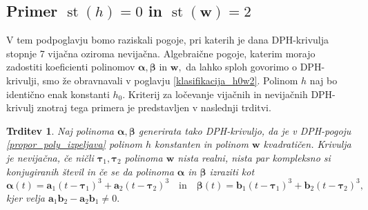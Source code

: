 \documentclass[12pt,a4paper,twoside]{article}
\theoremstyle{definition} %
\theoremstyle{plain} %
\newtheorem{trditev}[definicija]{Trditev}
\theoremstyle{primerstyle}
\numberwithin{equation}{section}  %
\newcommand{\aV}{\mathbf{a}}
\newcommand{\bV}{\mathbf{b}}
\newcommand{\wV}{\mathbf{w}}
\newcommand{\balpha}{\boldsymbol \alpha}
\newcommand{\bbeta}{\boldsymbol \beta}
\newcommand{\btau}{\boldsymbol \tau}
\DeclareMathOperator{\st}{st}
\begin{document}
\subsection{Primer \texorpdfstring{$\st(h)=0$}{st(h)=0} in \texorpdfstring{$\st(\wV)=2$}{st(w)=2}}
\label{locevanje_h0w2}

V tem podpoglavju bomo raziskali pogoje, pri katerih je dana DPH-krivulja stopnje 7 vijačna oziroma nevijačna. Algebraične pogoje, katerim morajo zadostiti koeficienti polinomov $\balpha,\bbeta$ in $\wV,$ da lahko sploh govorimo o DPH-krivulji, smo že obravnavali v poglavju \ref{klasifikacija_h0w2}. Polinom $h$ naj bo identično enak konstanti $h_0.$ Kriterij za ločevanje vijačnih in nevijačnih DPH-krivulj znotraj tega primera je predstavljen v naslednji trditvi.
\begin{trditev}
	\label{locevanje_trditev_h0w2}
	Naj polinoma $\balpha,\bbeta$ generirata tako DPH-krivuljo, da je v DPH-pogoju \eqref{propor_poly_izpeljava} polinom $h$ konstanten in polinom $\wV$ kvadratičen. Krivulja je nevijačna, če ničli $\btau_1,\btau_2$ polinoma $\wV$ nista realni, nista par kompleksno si konjugiranih števil in če se da polinoma $\balpha$ in $\bbeta$ izraziti kot
	\begin{equation}
		\label{polinoma_h0w2}
		\balpha(t)=\aV_1(t-\btau_1)^3+\aV_2(t-\btau_2)^3\quad\text{in}\quad\bbeta(t)=\bV_1(t-\btau_1)^3+\bV_2(t-\btau_2)^3,
	\end{equation}
	kjer velja $\aV_1\bV_2-\aV_2\bV_1\neq0.$
\end{trditev}
\end{document}

